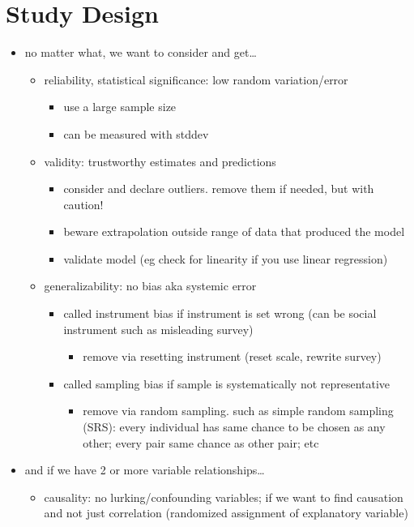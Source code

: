 \documentclass[11pt]{article}
\newcommand{\addsection}[1]{\addcontentsline{toc}{section}{#1}\section*{#1}}
\begin{document}
\newpage
\addsection{Study Design}
\begin{itemize}
  \item no matter what, we want to consider and get\dots
  \begin{itemize}
    \item reliability, statistical significance: low random variation/error
    \begin{itemize}
      \item use a large sample size
      \item can be measured with stddev
    \end{itemize}
    \item validity: trustworthy estimates and predictions
    \begin{itemize}
      \item consider and declare outliers. remove them if needed, but with caution!
      \item beware extrapolation outside range of data that produced the model
      \item validate model (eg check for linearity if you use linear regression)
    \end{itemize} 
    \item generalizability: no bias aka systemic error 
    \begin{itemize}
      \item called instrument bias if instrument is set wrong (can be social instrument such as misleading survey)
      \begin{itemize}
        \item remove via resetting instrument (reset scale, rewrite survey)
      \end{itemize}
      \item called sampling bias if sample is systematically not representative 
      \begin{itemize}
        \item remove via random sampling. such as simple random sampling (SRS): every individual has same chance to be chosen as any other; every pair same chance as other pair; etc
      \end{itemize}
    \end{itemize}
  \end{itemize}
  \item and if we have 2 or more variable relationships\dots
  \begin{itemize}
    \item causality: no lurking/confounding variables; if we want to find causation and not just correlation (randomized assignment of explanatory variable)

\end{itemize}
\end{itemize}
\end{document}
